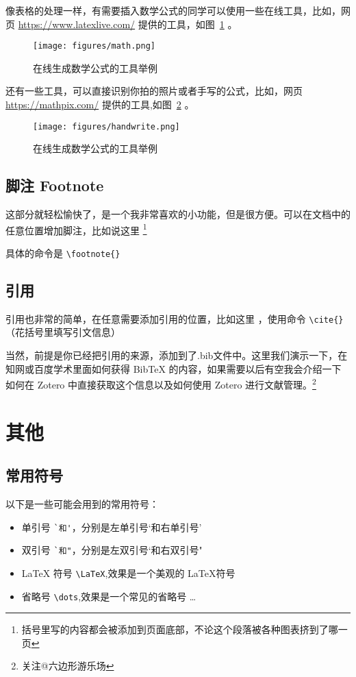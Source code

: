 
像表格的处理一样，有需要插入数学公式的同学可以使用一些在线工具，比如，网页 \url{https://www.latexlive.com/} 提供的工具，如图~\ref{fig:mathTool} 。

\begin{figure}[ht]
    \centering
    \texttt{[image: figures/math.png]}
    \caption{在线生成数学公式的工具举例}
    \label{fig:mathTool}
\end{figure}

还有一些工具，可以直接识别你拍的照片或者手写的公式，比如，网页 \url{https://mathpix.com/} 提供的工具,如图~\ref{fig:handwriteTool} 。

\begin{figure}[ht]
    \centering
    \texttt{[image: figures/handwrite.png]}
    \caption{在线生成数学公式的工具举例}
    \label{fig:handwriteTool}
\end{figure}

\newpage

\subsection{脚注 Footnote}
这部分就轻松愉快了，是一个我非常喜欢的小功能，但是很方便。可以在文档中的任意位置增加脚注，比如说这里 \footnote{括号里写的内容都会被添加到页面底部，不论这个段落被各种图表挤到了哪一页} \par

具体的命令是 \verb|\footnote{}|


\subsection{引用}
引用也非常的简单，在任意需要添加引用的位置，比如这里 \cite{zhangkun1994}，使用命令 \verb|\cite{}|（花括号里填写引文信息）\par

当然，前提是你已经把引用的来源，添加到了.bib文件中。这里我们演示一下，在知网或百度学术里面如何获得 BibTeX 的内容，如果需要以后有空我会介绍一下如何在 Zotero 中直接获取这个信息以及如何使用 Zotero 进行文献管理。\footnote{关注@六边形游乐场}

\section{其他}
\subsection{常用符号}
以下是一些可能会用到的常用符号：
\begin{itemize}
    \item  单引号 \verb|`和'|，分别是左单引号`和右单引号'
    \item  双引号 \verb|`和"|，分别是左双引号`和右双引号"
    \item  LaTeX 符号 \verb|\LaTeX|,效果是一个美观的 \LaTeX 符号  
    \item  省略号 \verb|\dots|,效果是一个常见的省略号 \dots
\end{itemize}

